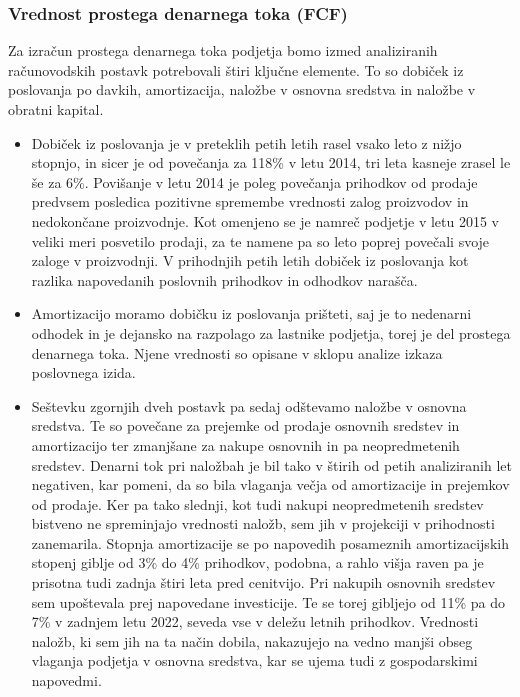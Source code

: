 \documentclass[12pt,a4paper]{amsart}
\theoremstyle{definition} %
\theoremstyle{plain} %
\begin{document}
\subsubsection{Vrednost prostega denarnega toka (FCF)}
Za izračun prostega denarnega toka podjetja bomo izmed analiziranih računovodskih postavk potrebovali štiri ključne elemente. To so dobiček iz poslovanja po davkih, amortizacija, naložbe v osnovna sredstva in naložbe v obratni kapital. 
\begin{itemize}
\item Dobiček iz poslovanja je v preteklih petih letih rasel vsako leto z nižjo stopnjo, in sicer je od povečanja za 118\% v letu 2014, tri leta kasneje zrasel le še za 6\%. Povišanje v letu 2014 je poleg povečanja prihodkov od prodaje predvsem posledica pozitivne spremembe vrednosti zalog proizvodov in nedokončane proizvodnje. Kot omenjeno se je namreč podjetje v letu 2015 v veliki meri posvetilo prodaji, za te namene pa so leto poprej povečali svoje zaloge v proizvodnji. V prihodnjih petih letih dobiček iz poslovanja kot razlika napovedanih poslovnih prihodkov in odhodkov narašča. 
\item Amortizacijo moramo dobičku iz poslovanja prišteti, saj je to nedenarni odhodek in je dejansko na razpolago za lastnike podjetja, torej je del prostega denarnega toka. Njene vrednosti so opisane v sklopu analize izkaza poslovnega izida.
\item Seštevku zgornjih dveh postavk pa sedaj odštevamo naložbe v osnovna sredstva. Te so povečane za prejemke od prodaje osnovnih sredstev in amortizacijo ter zmanjšane za nakupe osnovnih in pa neopredmetenih sredstev. Denarni tok pri naložbah je bil tako v štirih od petih analiziranih let negativen, kar pomeni, da so bila vlaganja večja od amortizacije in prejemkov od prodaje. Ker pa tako slednji, kot tudi nakupi neopredmetenih sredstev bistveno ne spreminjajo vrednosti naložb, sem jih v projekciji v prihodnosti zanemarila. Stopnja amortizacije se po napovedih posameznih amortizacijskih stopenj giblje od 3\% do 4\% prihodkov, podobna, a rahlo višja raven pa je prisotna tudi zadnja štiri leta pred cenitvijo. Pri nakupih osnovnih sredstev sem upoštevala prej napovedane investicije. Te se torej gibljejo od 11\% pa do 7\% v zadnjem letu 2022, seveda vse v deležu letnih prihodkov. Vrednosti naložb, ki sem jih na ta način dobila, nakazujejo na vedno manjši obseg vlaganja podjetja v osnovna sredstva, kar se ujema tudi z gospodarskimi napovedmi.

\end{itemize}
\end{document}
